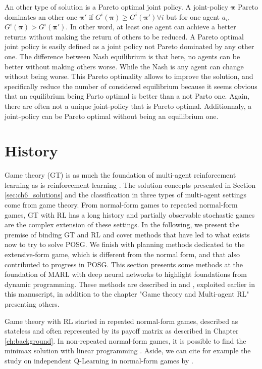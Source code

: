 An other type of solution is a Pareto optimal joint policy.
A joint-policy $\mathbf{\pi}$ Pareto dominates an other one $\mathbf{\pi'}$ if $G^i(\mathbf{\pi}) \ge G^i(\mathbf{\pi'})\forall i$ but for one agent $a_i$, $G^i(\mathbf{\pi}) > G^i(\mathbf{\pi'})$.
In other word, at least one agent can achieve a better returns without making the return of others to be reduced.
A Pareto optimal joint policy is easily defined as a joint policy not Pareto dominated by any other one.
The difference between Nash equilibrium is that here, no agents can be better without making others worse.
While the Nash is any agent can change without being worse.
This Pareto optimality allows to improve the solution, and specifically reduce the number of considered equilibrium because it seems obvious that an equilibrium being Parto optimal is better than a not Parto one.
Again, there are often not a unique joint-policy that is Pareto optimal.
Additionnaly, a joint-policy can be Pareto optimal without being an equilibrium one.


\section{History}\label{sec:ch6_history}
Game theory (GT) \citep{von1947theory} is as much the foundation of multi-agent reinforcement learning as is reinforcement learning \citep{Nowe2012GTMARL, marl-book}.
The solution concepts presented in Section \ref{sec:ch6_solutions} and the classification in three types of multi-agent settings come from game theory.
From normal-form games to repeated normal-form games, GT with RL has a long history and partially observable stochastic games are the complex extension of these settings.
In the following, we present the premise of binding GT and RL and cover methods that have led to what exists now to try to solve POSG.
We finish with planning methods dedicated to the extensive-form game, which is different from the normal form, and that also contributed to progress in POSG.
This section presents some methods at the foundation of MARL with deep neural networks to highlight foundations from dynamic programming.
These methods are described in \citep{marl-book} and \citep{russel2010}, exploited earlier in this manuscript, in addition to the chapter "Game theory and Multi-agent RL" \citep{Nowe2012GTMARL} presenting others.

Game theory with RL started in repeated normal-form games, described as stateless and often represented by its payoff matrix as described in Chapter \ref{ch:background}.
In non-repeated normal-form games, it is possible to find the minimax solution with linear programming \citep{marl-book}.
Aside, we can cite for example the study on independent Q-Learning in normal-form games by \cite{claus1998dynamics}.

